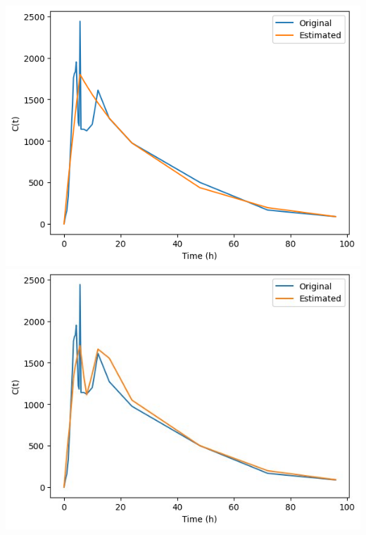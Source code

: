 \documentclass[12pt]{article}
\begin{document}
\begin{minipage}{0.48\linewidth}
	\includegraphics[width=2.0\linewidth]{results/basic_6.png}\newline
	\includegraphics[width=2.0\linewidth]{results/6.jpg}\newline
\end{minipage}

\newpage



\end{document}
